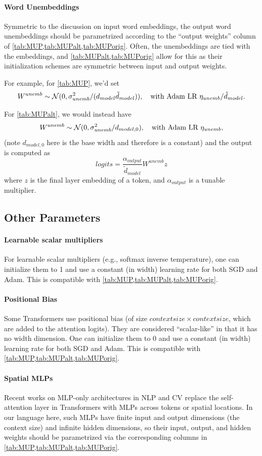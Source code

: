 \documentclass{article}
\theoremstyle{definition}
\begin{document}
\paragraph{Word Unembeddings}
Symmetric to the discussion on input word embeddings, the output word unembeddings should be parametrized according to the ``output weights'' column of \cref{tab:MUP,tab:MUPalt,tab:MUPorig}.
Often, the unembeddings are tied with the embeddings, and \cref{tab:MUPalt,tab:MUPorig} allow for this as their initialization schemes are symmetric between input and output weights.

For example, for \cref{tab:MUP}, we'd set
\[
  W^{unemb} \sim \mathcal{N}(0, \sigma^2_{unemb}/(d_{model} \tilde d_{model})),\quad\text{with Adam LR }\eta_{unemb}/\tilde d_{model}.
\]

For \cref{tab:MUPalt}, we would instead have
\[
  W^{unemb} \sim \mathcal{N}(0, \sigma^2_{unemb} / d_{model,0}),\quad\text{with Adam LR }\eta_{unemb},
\]
(note $d_{model,0}$ here is the base width and therefore is a constant)
and the output is computed as
\[
  logits = \frac{\alpha_{output}}{\tilde d_{model}} W^{unemb} z\]
where $z$ is the final layer embedding of a token, and $\alpha_{output}$ is a tunable multiplier.

\subsection{Other Parameters}
\label{sec:otherparams}

\paragraph{Learnable scalar multipliers}
For learnable scalar multipliers (e.g., softmax inverse temperature), one can initialize them to 1 and use a constant (in width) learning rate for both SGD and Adam.
This is compatible with \cref{tab:MUP,tab:MUPalt,tab:MUPorig}.

\paragraph{Positional Bias}
Some Transformers use positional bias (of size $contextsize \times contextsize$, which are added to the attention logits).
They are considered ``scalar-like'' in that it has no width dimension.
One can initialize them to 0 and use a constant (in width) learning rate for both SGD and Adam.
This is compatible with \cref{tab:MUP,tab:MUPalt,tab:MUPorig}.

\paragraph{Spatial MLPs}
Recent works \citep{liu_pay_2021,tolstikhin_mlp-mixer_2021,melas-kyriazi_you_2021,touvron_resmlp_2021,ding_repmlp_2021} on MLP-only architectures in NLP and CV replace the self-attention layer in Transformers with MLPs across tokens or spatial locations.
In our language here, such MLPs have finite input and output dimensions (the context size) and infinite hidden dimensions, so their input, output, and hidden weights should be parametrized via the corresponding columns in \cref{tab:MUP,tab:MUPalt,tab:MUPorig}.
\end{document}
